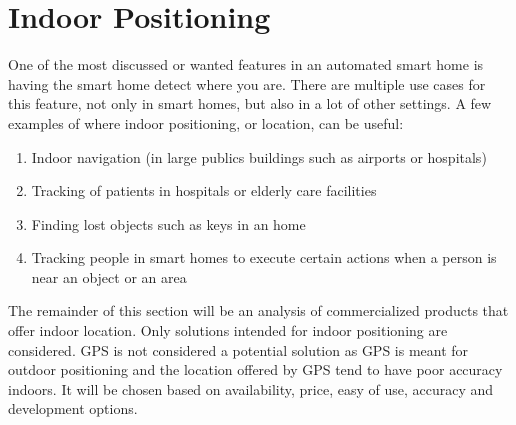 \section{Indoor Positioning}\label{sec:indoor-positioning}
One of the most discussed or wanted features in an automated smart home is having the smart home detect where you are.
There are multiple use cases for this feature, not only in smart homes, but also in a lot of other settings. 
A few examples of where indoor positioning, or location, can be useful:
\begin{enumerate}
    \item Indoor navigation (\eg in large publics buildings such as airports or hospitals)
    \item Tracking of patients in \eg hospitals or elderly care facilities
    \item Finding lost objects such as keys in an home
    \item Tracking people in smart homes to execute certain actions when a person is near an object or an area
\end{enumerate}

The remainder of this section will be an analysis of commercialized products that offer indoor location.
Only solutions intended for indoor positioning are considered.
GPS is not considered a potential solution as GPS is meant for outdoor positioning and the location offered by GPS tend to have poor accuracy indoors.
It will be chosen based on availability, price, easy of use, accuracy and development options.
 

